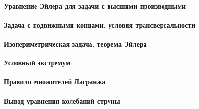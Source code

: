 \documentclass[russian,twocolumn]{article}
\begin{document}
\paragraph{Уравнение Эйлера для задачи с высшими производными}

\paragraph{Задача с подвижными концами, условия трансверсальности}

\paragraph{Изопериметрическая задача, теорема Эйлера}

\paragraph{Условный экстремум}

\paragraph{Правило множителей Лагранжа}

\paragraph{Вывод уравнения колебаний струны}
\end{document}
